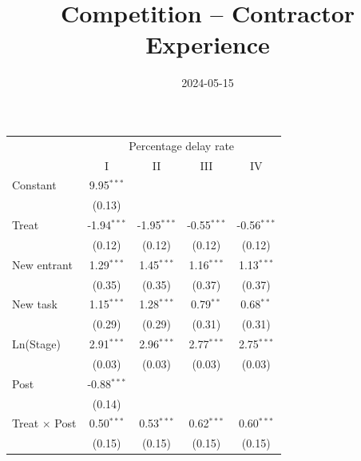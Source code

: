 \documentclass[
]{article}
\title{Competition -- Contractor Experience}
\author{}
\date{\vspace{-2.5em}2024-05-15}
\begin{document}
\maketitle

\begingroup
\centering
\small
\begin{tabular}{lcccc}
   \toprule
    & \multicolumn{4}{c}{Percentage delay rate}\\
                                              & I             & II            & III           & IV\\  
   Constant                                   & 9.95$^{***}$  &               &               &   \\   
                                              & (0.13)        &               &               &   \\   
   Treat                                      & -1.94$^{***}$ & -1.95$^{***}$ & -0.55$^{***}$ & -0.56$^{***}$\\   
                                              & (0.12)        & (0.12)        & (0.12)        & (0.12)\\   
   New entrant                                & 1.29$^{***}$  & 1.45$^{***}$  & 1.16$^{***}$  & 1.13$^{***}$\\   
                                              & (0.35)        & (0.35)        & (0.37)        & (0.37)\\   
   New task                                   & 1.15$^{***}$  & 1.28$^{***}$  & 0.79$^{**}$   & 0.68$^{**}$\\   
                                              & (0.29)        & (0.29)        & (0.31)        & (0.31)\\   
   Ln(Stage)                                  & 2.91$^{***}$  & 2.96$^{***}$  & 2.77$^{***}$  & 2.75$^{***}$\\   
                                              & (0.03)        & (0.03)        & (0.03)        & (0.03)\\   
   Post                                       & -0.88$^{***}$ &               &               &   \\   
                                              & (0.14)        &               &               &   \\   
   Treat $\times$ Post                        & 0.50$^{***}$  & 0.53$^{***}$  & 0.62$^{***}$  & 0.60$^{***}$\\   
                                              & (0.15)        & (0.15)        & (0.15)        & (0.15)\\   

\end{tabular}
\end{document}
